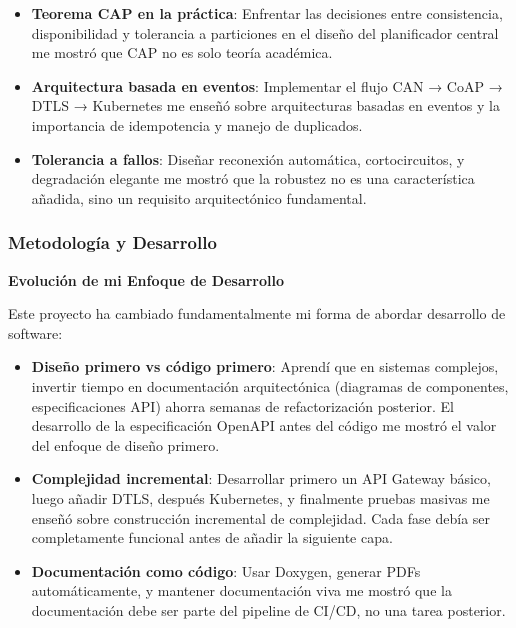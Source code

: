 \begin{itemize}
    \item \textbf{Teorema CAP en la práctica}: Enfrentar las decisiones entre consistencia, disponibilidad y tolerancia a particiones en el diseño del planificador central me mostró que CAP no es solo teoría académica.
    
    \item \textbf{Arquitectura basada en eventos}: Implementar el flujo CAN → CoAP → DTLS → Kubernetes me enseñó sobre arquitecturas basadas en eventos y la importancia de idempotencia y manejo de duplicados.
    
    \item \textbf{Tolerancia a fallos}: Diseñar reconexión automática, cortocircuitos, y degradación elegante me mostró que la robustez no es una característica añadida, sino un requisito arquitectónico fundamental.
\end{itemize}

\subsubsection{Metodología y Desarrollo}

\textbf{Evolución de mi Enfoque de Desarrollo}

Este proyecto ha cambiado fundamentalmente mi forma de abordar desarrollo de software:

\begin{itemize}
    \item \textbf{Diseño primero vs código primero}: Aprendí que en sistemas complejos, invertir tiempo en documentación arquitectónica (diagramas de componentes, especificaciones API) ahorra semanas de refactorización posterior. El desarrollo de la especificación OpenAPI antes del código me mostró el valor del enfoque de diseño primero.
    
    \item \textbf{Complejidad incremental}: Desarrollar primero un API Gateway básico, luego añadir DTLS, después Kubernetes, y finalmente pruebas masivas me enseñó sobre construcción incremental de complejidad. Cada fase debía ser completamente funcional antes de añadir la siguiente capa.
    
    \item \textbf{Documentación como código}: Usar Doxygen, generar PDFs automáticamente, y mantener documentación viva me mostró que la documentación debe ser parte del pipeline de CI/CD, no una tarea posterior.
\end{itemize}

